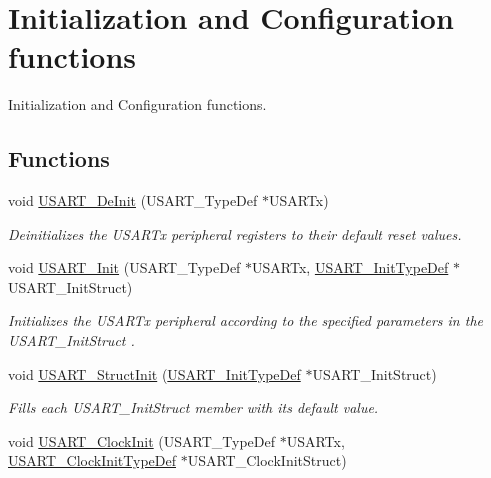 \hypertarget{group___u_s_a_r_t___group1}{\section{Initialization and Configuration functions}
\label{group___u_s_a_r_t___group1}
}


Initialization and Configuration functions.  


\subsection*{Functions}
\begin{DoxyCompactItemize}
\item 
void \hyperlink{group___u_s_a_r_t___group1_ga2f8e1ce72da21b6539d8e1f299ec3b0d}{U\-S\-A\-R\-T\-\_\-\-De\-Init} (U\-S\-A\-R\-T\-\_\-\-Type\-Def $\ast$U\-S\-A\-R\-Tx)
\begin{DoxyCompactList}\small\item\em Deinitializes the U\-S\-A\-R\-Tx peripheral registers to their default reset values. \end{DoxyCompactList}\item 
void \hyperlink{group___u_s_a_r_t___group1_ga98da340ea0324002ba1b4263e91ab2ff}{U\-S\-A\-R\-T\-\_\-\-Init} (U\-S\-A\-R\-T\-\_\-\-Type\-Def $\ast$U\-S\-A\-R\-Tx, \hyperlink{struct_u_s_a_r_t___init_type_def}{U\-S\-A\-R\-T\-\_\-\-Init\-Type\-Def} $\ast$U\-S\-A\-R\-T\-\_\-\-Init\-Struct)
\begin{DoxyCompactList}\small\item\em Initializes the U\-S\-A\-R\-Tx peripheral according to the specified parameters in the U\-S\-A\-R\-T\-\_\-\-Init\-Struct . \end{DoxyCompactList}\item 
void \hyperlink{group___u_s_a_r_t___group1_ga34e1faa2f312496c16cfd05155f4c8b1}{U\-S\-A\-R\-T\-\_\-\-Struct\-Init} (\hyperlink{struct_u_s_a_r_t___init_type_def}{U\-S\-A\-R\-T\-\_\-\-Init\-Type\-Def} $\ast$U\-S\-A\-R\-T\-\_\-\-Init\-Struct)
\begin{DoxyCompactList}\small\item\em Fills each U\-S\-A\-R\-T\-\_\-\-Init\-Struct member with its default value. \end{DoxyCompactList}\item 
void \hyperlink{group___u_s_a_r_t___group1_gadb50c7a2175c91acd3728f8eefd0c63d}{U\-S\-A\-R\-T\-\_\-\-Clock\-Init} (U\-S\-A\-R\-T\-\_\-\-Type\-Def $\ast$U\-S\-A\-R\-Tx, \hyperlink{struct_u_s_a_r_t___clock_init_type_def}{U\-S\-A\-R\-T\-\_\-\-Clock\-Init\-Type\-Def} $\ast$U\-S\-A\-R\-T\-\_\-\-Clock\-Init\-Struct)

\end{DoxyCompactItemize}
